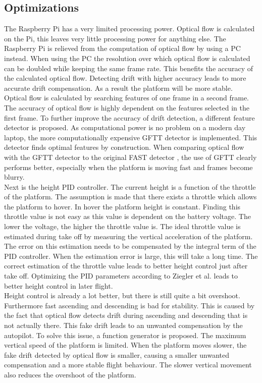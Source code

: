 \documentclass[twocolumn]{phdsymp} %
\begin{document}
\subsection{Optimizations}
The Raspberry Pi has a very limited processing power. Optical flow is calculated on the Pi, this leaves very little processing power for anything else. The Raspberry Pi is relieved from the computation of optical flow by using a PC instead. When using the PC the resolution over which optical flow is calculated can be doubled while keeping the same frame rate. This benefits the accuracy of the calculated optical flow. Detecting drift with higher accuracy leads to more accurate drift compensation. As a result the platform will be more stable.\\
Optical flow is calculated by searching features of one frame in a second frame. The accuracy of optical flow is highly dependent on the features selected in the first frame. To further improve the accuracy of drift detection, a different feature detector is proposed. As computational power is no problem on a modern day laptop, the more computationally expensive GFTT detector \cite{paper:GFTT} is implemented. This detector finds optimal features by construction. When comparing optical flow with the GFTT detector to the original FAST detector \cite{paper:FAST}, the use of GFTT clearly performs better, especially when the platform is moving fast and frames become blurry.\\
Next is the height PID controller. The current height is a function of the throttle of the platform. The assumption is made that there exists a throttle which allows the platform to hover. In hover the platform height is constant. Finding this throttle value is not easy as this value is dependent on the battery voltage. The lower the voltage, the higher the throttle value is. The ideal throttle value is estimated during take off by measuring the vertical acceleration of the platform. The error on this estimation needs to be compensated by the integral term of the PID controller. When the estimation error is large, this will take a long time. The correct estimation of the throttle value leads to better height control just after take off. Optimizing the PID parameters according to Ziegler et al. \cite{paper:ZieglerNichols} leads to better height control in later flight.\\
Height control is already a lot better, but there is still quite a bit overshoot. Furthermore fast ascending and descending is bad for stability. This is caused by the fact that optical flow detects drift during ascending and descending that is not actually there. This fake drift leads to an unwanted compensation by the autopilot. To solve this issue, a function generator is proposed. The maximum vertical speed of the platform is limited. When the platform moves slower, the fake drift detected by optical flow is smaller, causing a smaller unwanted compensation and a more stable flight behaviour. The slower vertical movement also reduces the overshoot of the platform.\\
\end{document}
